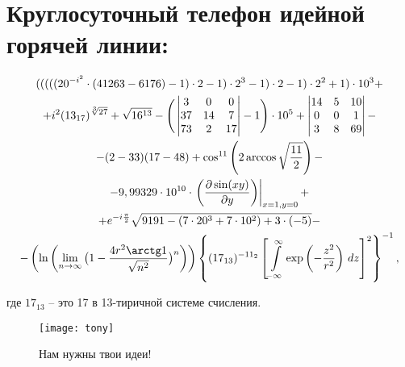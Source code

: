 \section*{Круглосуточный телефон идейной горячей линии:}
\begin{gather*}
 (((((20^{-i^2}\cdot (41263-6176)-1)\cdot 2-1)\cdot 2^3 -1)\cdot 2-1)\cdot 2^2 +1)\cdot 10^3 +\\+ i^2(13_{17})^{\sqrt[3]{27}} +\sqrt{16^{13}} -\Bigg(
\begin{vmatrix}{}
3 & 0 & 0 \\
37 & 14 & 7 \\
73 & 2 & 17
\end{vmatrix}
 -1 \Bigg)\cdot 10^5 +
\begin{vmatrix}{}
14 & 5 & 10 \\
0 & 0 & 1 \\
3 & 8 & 69
\end{vmatrix}
 -\\- (2-33)(17-48) + \cos^{11}\left(2\arccos\sqrt{\frac{11}{2}}\right)  -\\- 9,99329\cdot 10^{10}\cdot \left.\bigg(\frac{\partial \sin(xy)}{\partial y}\bigg)\right|_{x=1,y=0} + \\ + e^{-i\frac{\pi}{2}}\sqrt{9191 -(7\cdot 20^3+7\cdot 10^2) + 3\cdot (-5)} - \\ -
\left(\ln\left(\lim\limits_{n \rightarrow \infty}\big(1-\frac{4r^2 \arctg 1}{\sqrt{n^2}} \big)^n\right)\right)\left\{(17_{13})^{-11_2}\left[\int\limits_{-\infty}^{\infty}\exp\left(-\frac{z^2}{r^2}\right)\,dz \right]^2\right\}^{-1},
\end{gather*}

где $17_{13}$ -- это 17 в 13-тиричной системе счисления.

\begin{figure}[ht!]
    \centering
    \texttt{[image: tony]}
    \caption{Нам нужны твои идеи!}
\end{figure}
